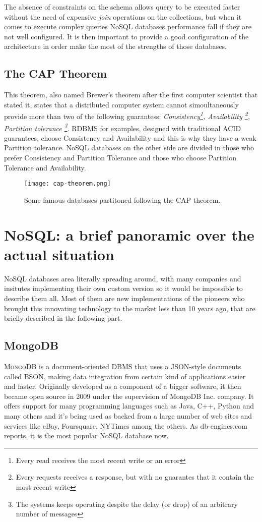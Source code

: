 The absence of constraints on the schema allows query to be executed faster without the need of expensive \textit{join} operations on the collections, but when it comes to execute complex queries NoSQL databases performance fall if they are not well configured.
It is then important to provide a good configuration of the architecture in order make the most of the strengths of those databases.




\subsection{The CAP Theorem}
This theorem, also named Brewer's theorem after the first computer scientist that stated it, states that a distributed computer system cannot simoultaneously provide more than two of the following guarantess: \textit{Consistency\footnote {Every read receives the most recent write or an error}, Availability \footnote{Every requests receives a response, but with no guarantes that it contain the most recent write}, Partition tolerance \footnote{The systems keeps operating despite the delay (or drop) of an arbitrary number of messages }}.
RDBMS for examples, designed with traditional ACID guarantees, choose Consistency and Availability and this is why they have a weak Partition tolerance.
NoSQL databases on the other side are divided in those who prefer Consistency and Partition Tolerance and those who choose Partition Tolerance and Availability.
\begin{figure}[H]
\texttt{[image: cap-theorem.png]}
\centering
\caption{Some famous databases partitoned following the CAP theorem.}
\end{figure}



\section {NoSQL: a brief panoramic over the actual situation}
NoSQL databases area literally spreading around, with many companies and insitutes implementing their own custom version so it would be impossible to describe them all. 
Most of them are new implementations of the pioneers who brought this innovating technology to the market less than 10 years ago, that are briefly described in the following part.

\subsection{MongoDB}
\textsc{MongoDB} is a document-oriented DBMS that uses a JSON-style documents called BSON, making data integration from certain kind of applications easier and faster.
Originally developed as a component of a bigger software, it then became open source in 2009 under the supervision of MongoDB Inc. company.
It offers support for many programming languages such as Java, C++, Python and many others and it’s being used as backed from a large number of web sites and services like eBay, Foursquare, NYTimes among the others.
As db-engines.com reports, it is the most popular NoSQL database now.


